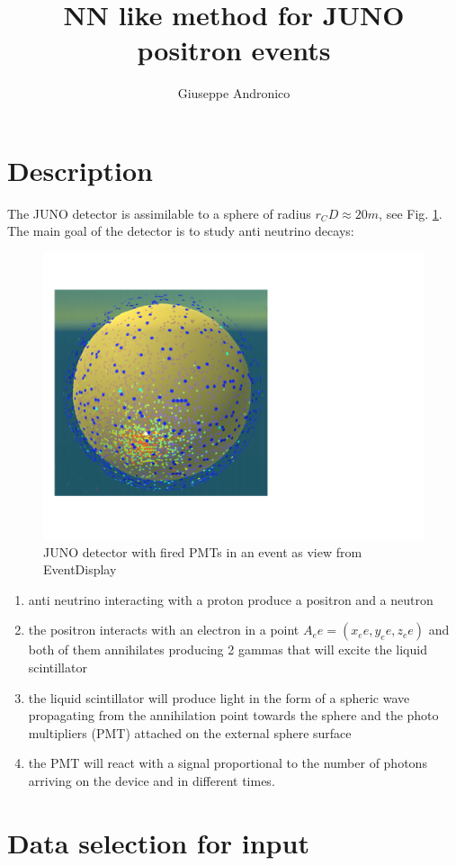 \documentclass[12pt,a4paper,draft]{article}
\author{Giuseppe Andronico}
\title{NN like method for JUNO positron events}
\begin{document}
\section{Description}
 The JUNO detector is assimilable to a sphere of radius $r_CD \approx 20 m$, see Fig. \ref{fig:eventdisplay}. The main goal of the detector is to study anti neutrino decays:
 \begin{figure}
 \centering
 \includegraphics[]{images/EventDisplay}
 \caption[Event in EventDisplay]{JUNO detector with fired PMTs in an event as view from EventDisplay}
 \label{fig:eventdisplay}
 \end{figure}
 \begin{enumerate}
 \item anti neutrino interacting with a proton produce a positron and a neutron
 \item the positron interacts with an electron in a point $A_ee = (x_ee,y_ee,z_ee)$ and both of them annihilates producing 2 gammas that will excite the liquid scintillator
 \item the liquid scintillator will produce light in the form of a spheric wave propagating from the annihilation point towards the sphere and the photo multipliers (PMT) attached on the external sphere surface
 \item the PMT will react with a signal proportional to the number of photons arriving on the device and in different times.
 \end{enumerate}
\section{Data selection for input}
\end{document}
